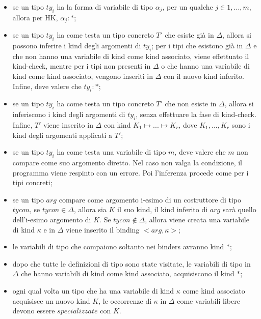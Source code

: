 \documentclass[10pt,a4paper]{article}
\begin{document}
\begin{itemize}
    \item se un tipo $ ty_i $ ha la forma di variabile di tipo $ \alpha_j $, per un qualche $ j \in {1, ..., m} $, allora
    per HK, $ \alpha_j : * $;
    \item se un tipo $ ty_i $ ha come testa un tipo concreto $ T' $ che esiste già in $ \Delta $, allora si possono
    inferire i kind degli argomenti di $ ty_i $; per i tipi che esistono già in $ \Delta $ e che non hanno una variabile
    di kind come kind associato, viene effettuato il kind-check, mentre per i tipi non presenti in $ \Delta $ o che
    hanno una variabile di kind come kind associato, vengono inseriti in $ \Delta $ con il nuovo kind inferito. Infine,
    deve valere che $ ty_i : * $;
    \item se un tipo $ ty_i $ ha come testa un tipo concreto $ T' $ che non esiste in $ \Delta $, allora si inferiscono
    i kind degli argomenti di $ ty_i $, senza effettuare la fase di kind-check. Infine, $ T' $ viene inserito in
    $ \Delta $ con kind $ K_1 \mapsto ... \mapsto K_r $, dove $ K_1, ..., K_r $ sono i kind degli argomenti applicati a
    $ T' $;
    \item se un tipo $ ty_i $ ha come testa una variabile di tipo $ m $, deve valere che $ m $ non compare come suo
    argomento diretto. Nel caso non valga la condizione, il programma viene respinto con un errore. Poi l'inferenza
    procede come per i tipi concreti;
    \item se un tipo $ arg $ compare come argomento i-esimo di un costruttore di tipo $ tycon $, se $ tycon \in \Delta $,
    allora sia $ K $ il suo kind, il kind inferito di $ arg $ sarà quello dell'i-esimo argomento di $ K $. Se
    $ tycon \notin \Delta $, allora viene creata una variabile di kind $ \kappa $ e in $ \Delta $ viene inserito il
    binding $ < arg, \kappa > $;
    \item le variabili di tipo che compaiono soltanto nei binders avranno kind $ * $;
    \item dopo che tutte le definizioni di tipo sono state visitate, le variabili di tipo in $ \Delta $ che hanno
    variabili di kind come kind associato, acquisiscono il kind $ * $;
    \item ogni qual volta un tipo che ha una variabile di kind $ \kappa $ come kind associato acquisisce un nuovo kind
    $ K $, le occorrenze di $ \kappa $ in $ \Delta $ come variabili libere devono essere $ specializzate $ con $ K $.
\end{itemize}
\end{document}
